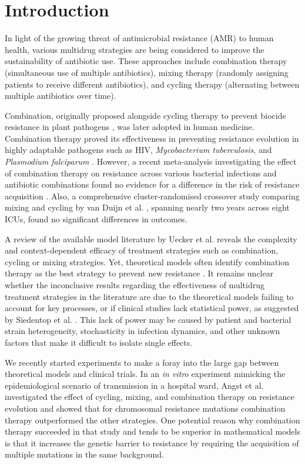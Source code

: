 \section{Introduction}
In light of the growing threat of antimicrobial resistance (AMR) to human health, various multidrug strategies are being considered to improve the sustainability of antibiotic use.
These approaches include combination therapy (simultaneous use of multiple antibiotics), mixing therapy (randomly assigning patients to receive different antibiotics), and cycling therapy (alternating between multiple antibiotics over time).

Combination, originally proposed alongside cycling therapy to prevent biocide resistance in plant pathogens \cite{Kable1980, Delp1980, Skylakakis1981}, was later adopted in human medicine.
Combination therapy proved its effectiveness in preventing resistance evolution in highly adaptable pathogens such as HIV, \textit{Mycobacterium tuberculosis}, and \textit{Plasmodium falciparum} \cite{Goldberg2012}. 
However, a recent meta-analysis investigating the effect of combination therapy on resistance across various bacterial infections and antibiotic combinations found no evidence for a difference in the risk of resistance acquisition \cite{siedentop_metaanalysis_2024}. 
Also, a comprehensive cluster-randomised crossover study comparing mixing and cycling by van Duijn et al. \cite{VanDuijn2018}, spanning nearly two years across eight ICUs, found no significant differences in outcomes.

A review of the available model literature by Uecker et al. \cite{Uecker2021} reveals the complexity and context-dependent efficacy of treatment strategies such as combination, cycling or mixing strategies.
Yet, theoretical models often identify combination therapy as the best strategy to prevent new resistance \cite{Bonhoeffer1997, Tepekule2017}.
It remains unclear whether the inconclusive results regarding the effectiveness of multidrug treatment strategies in the literature are due to the theoretical models failing to account for key processes, or if clinical studies lack statistical power, as suggested by Siedentop et al. \cite{siedentop_metaanalysis_2024}.
This lack of power may be caused by patient and bacterial strain heterogeneity, stochasticity in infection dynamics, and other unknown factors that make it difficult to isolate single effects.

We recently started experiments to make a foray into the large gap between theoretical models and clinical trials.
In an \textit{in vitro} experiment mimicking the epidemiological scenario of transmission in a hospital ward, Angst et al. \cite{Angst2021} investigated the effect of cycling, mixing, and combination therapy on resistance evolution and showed that for chromosomal resistance mutations combination therapy outperformed the other strategies.
One potential reason why combination therapy succeeded in that study and tends to be superior in mathematical models is that it increases the genetic barrier to resistance by requiring the acquisition of multiple mutations in the same background.


